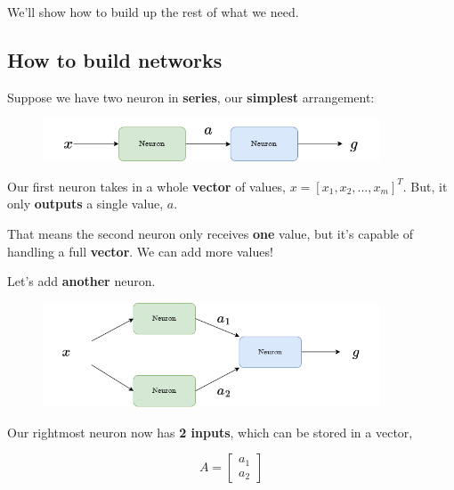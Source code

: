         We'll show how to build up the rest of what we need.
    
    \subsection*{How to build networks}
        
        Suppose we have two neuron in \textbf{series}, our \textbf{simplest} arrangement:
        
        \begin{figure}[H]
            \centering
            \includegraphics[width=100mm,scale=0.4]{images/nn_images/series_a.png}
        \end{figure}
        
        Our first neuron takes in a whole \textbf{vector} of values, $x = [x_1, x_2, ..., x_m]^T$. But, it only \textbf{outputs} a single value, $a$.
        
        That means the second neuron only receives \textbf{one} value, but it's capable of handling a full \textbf{vector}. We can add more values!
        
        Let's add \textbf{another} neuron.
        
        \begin{figure}[H]
            \centering
            \includegraphics[width=100mm,scale=0.4]{images/nn_images/two_neurons_a.png}
        \end{figure}
        
        Our rightmost neuron now has \textbf{2 inputs}, which can be stored in a vector,
        
        \begin{equation}
            A = 
            \begin{bmatrix}
              a_1 \\ a_2
            \end{bmatrix}
        \end{equation}
        
